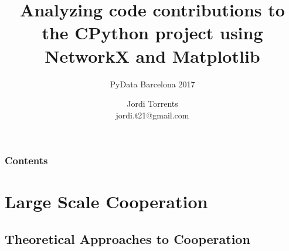 \documentclass[ignorenonframetext,red,8pt,notes=hide]{beamer}
\title[Analyzing code contributions to the CPython project]{Analyzing code contributions to the CPython project using NetworkX and Matplotlib}
\subtitle{PyData Barcelona 2017}
\author{Jordi Torrents\\ jordi.t21@gmail.com}
\institute{Department of Sociology\\University of Barcelona}
\begin{document}
\begin{frame}[label=portada]
\maketitle
\end{frame}

\begin{frame}[label=toc]
\frametitle{Contents}
\tableofcontents
\end{frame}

\section{Large Scale Cooperation}

\subsection{Theoretical Approaches to Cooperation}
\end{document}
